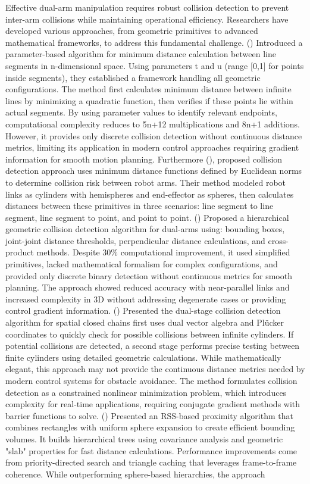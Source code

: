 \documentclass[utf8]{FrontiersinHarvard}
\begin{document}
Effective dual-arm manipulation requires robust collision detection to prevent inter-arm collisions while maintaining operational efficiency. Researchers have developed various approaches, from geometric primitives to advanced mathematical frameworks, to address this fundamental challenge. (\citet{LUMELSKY198555}) Introduced a parameter-based algorithm for minimum distance calculation between line segments in n-dimensional space. Using parameters t and u (range [0,1] for points inside segments), they established a framework handling all geometric configurations. The method first calculates minimum distance between infinite lines by minimizing a quadratic function, then verifies if these points lie within actual segments. By using parameter values to identify relevant endpoints, computational complexity reduces to 5n+12 multiplications and 8n+1 additions. However, it provides only discrete collision detection without continuous distance metrics, limiting its application in modern control approaches requiring gradient information for smooth motion planning. Furthermore (\citet{chang1990collision}), proposed collision detection approach uses minimum distance functions defined by Euclidean norms to determine collision risk between robot arms. Their method modeled robot links as cylinders with hemispheres and end-effector as spheres, then calculates distances between these primitives in three scenarios: line segment to line segment, line segment to point, and point to point. (\citet{lee2001real}) Proposed a hierarchical geometric collision detection algorithm for dual-arms using: bounding boxes, joint-joint distance thresholds, perpendicular distance calculations, and cross-product methods. Despite 30$\%$ computational improvement, it used simplified primitives, lacked mathematical formalism for complex configurations, and provided only discrete binary detection without continuous metrics for smooth planning. The approach showed reduced accuracy with near-parallel links and increased complexity in 3D without addressing degenerate cases or providing control gradient information. (\citet{collision_spatial_chains}) Presented the dual-stage collision detection algorithm for spatial closed chains first uses dual vector algebra and Plücker coordinates \citep{Miller2005} to quickly check for possible collisions between infinite cylinders. If potential collisions are detected, a second stage performs precise testing between finite cylinders using detailed geometric calculations. While mathematically elegant, this approach may not provide the continuous distance metrics needed by modern control systems for obstacle avoidance. The method formulates collision detection as a constrained nonlinear minimization problem, which introduces complexity for real-time applications, requiring conjugate gradient methods with barrier functions to solve. (\citet{845311}) Presented an RSS-based proximity algorithm that combines rectangles with uniform sphere expansion to create efficient bounding volumes. It builds hierarchical trees using covariance analysis and geometric "slab" properties for fast distance calculations. Performance improvements come from priority-directed search and triangle caching that leverages frame-to-frame coherence. While outperforming sphere-based hierarchies, the approach 
\end{document}
